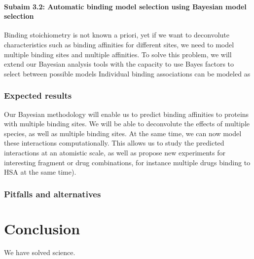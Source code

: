 \documentclass[10pt,final]{article}
\newcommand{\subsubsubsection}[1]{\paragraph*{#1}}
\begin{document}
\subsubsubsection{Subaim 3.2: Automatic binding model selection using Bayesian model selection}
Binding stoichiometry is not known a priori, yet if we want to deconvolute characteristics such as binding affinities for different sites, we need to model multiple binding sites and multiple affinities. To solve this problem, we will extend our Bayesian analysis tools with the capacity to use Bayes factors to select between possible models 
Individual binding associations can be modeled as

\subsubsection*{Expected results}
Our Bayesian methodology will enable us to predict binding affinities to proteins with multiple binding sites. We will be able to deconvolute the effects of multiple species, as well as multiple binding sites. At the same time, we can now model these interactions computationally. This allows us to study the predicted interactions at an atomistic scale, as well as propose new experiments for interesting fragment or drug combinations, for instance multiple drugs binding to HSA at the same time).

\subsubsection*{Pitfalls and alternatives}

\section*{Conclusion}
We have solved science.

\printbibliography
\end{document}
